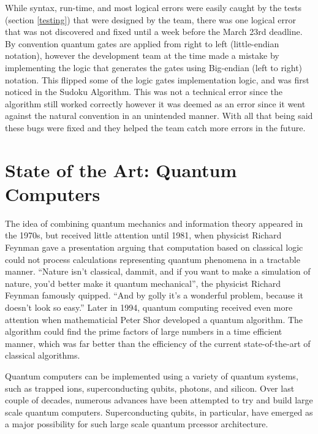 \documentclass{article}
\begin{document}
While syntax, run-time, and most logical errors were easily caught by the tests (section \ref{testing}) that were designed by the team, there was one logical error that was not discovered and fixed until a week before the March 23rd deadline.
By convention quantum gates are applied from right to left (little-endian notation), however the development team at the time made a mistake by implementing the logic that generates the gates using Big-endian (left to right) notation.
This flipped some of the logic gates implementation logic, and was first noticed in the Sudoku Algorithm.
This was not a technical error since the algorithm still worked correctly however it was deemed as an error since it went against the natural convention in an unintended manner.
With all that being said these bugs were fixed and they helped the team catch more errors in the future.

\pagebreak

\section{State of the Art: Quantum Computers}

\noindent
The idea of combining quantum mechanics and information theory appeared in the 1970s, but received little attention until 1981, when physicist Richard Feynman gave a presentation arguing that computation based on classical logic could not process calculations representing quantum phenomena in a tractable manner. \cite{gamble2019quantum} “Nature isn’t classical, dammit, and if you want to make a simulation of nature, you’d better make it
quantum mechanical”, the physicist Richard Feynman famously quipped. “And by golly it’s a
wonderful problem, because it doesn’t look so easy.” \cite{huang2020superconducting}
Later in 1994, quantum computing received even more attention when mathematicial Peter Shor developed a quantum algorithm. The algorithm could find the prime factors of large numbers in a time efficient manner, which was far better than the efficiency of the current state-of-the-art of classical algorithms.

\vspace{5mm}


Quantum computers can be implemented using a variety of quantum systems, such as trapped ions, superconducting qubits, photons, and silicon. Over last couple of decades, numerous advances have been attempted to try and build large scale quantum computers. Superconducting qubits, in particular, have emerged as a major possibility for such large scale quantum prcessor architecture.
\end{document}
